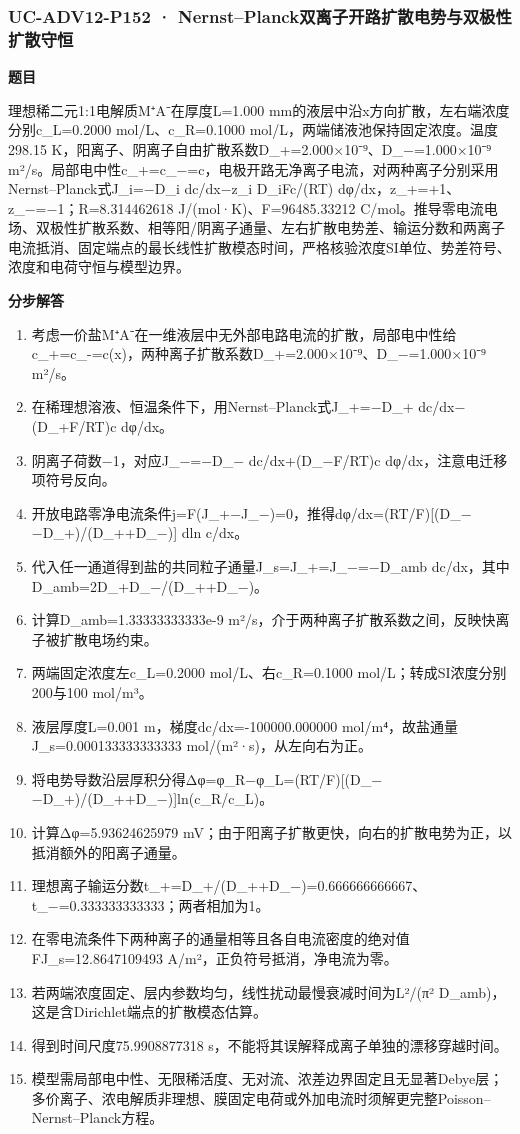 \documentclass[UTF8,11pt,a4paper]{ctexart}
\begin{document}
\subsubsection*{UC-ADV12-P152 · Nernst–Planck双离子开路扩散电势与双极性扩散守恒}
\noindent\textbf{题目}\par
理想稀二元1:1电解质M⁺A⁻在厚度L=1.000 mm的液层中沿x方向扩散，左右端浓度分别c\_L=0.2000 mol/L、c\_R=0.1000 mol/L，两端储液池保持固定浓度。温度298.15 K，阳离子、阴离子自由扩散系数D\_+=2.000×10⁻⁹、D\_−=1.000×10⁻⁹ m²/s。局部电中性c\_+=c\_−=c，电极开路无净离子电流，对两种离子分别采用Nernst–Planck式J\_i=−D\_i dc/dx−z\_i D\_iFc/(RT) dφ/dx，z\_+=+1、z\_−=−1；R=8.314462618 J/(mol·K)、F=96485.33212 C/mol。推导零电流电场、双极性扩散系数、相等阳/阴离子通量、左右扩散电势差、输运分数和两离子电流抵消、固定端点的最长线性扩散模态时间，严格核验浓度SI单位、势差符号、浓度和电荷守恒与模型边界。\par
\medskip\noindent\textbf{分步解答}
\begin{enumerate}
\item 考虑一价盐M⁺A⁻在一维液层中无外部电路电流的扩散，局部电中性给c\_+=c\_-=c(x)，两种离子扩散系数D\_+=2.000×10⁻⁹、D\_−=1.000×10⁻⁹ m²/s。
\item 在稀理想溶液、恒温条件下，用Nernst–Planck式J\_+=−D\_+ dc/dx−(D\_+F/RT)c dφ/dx。
\item 阴离子荷数−1，对应J\_−=−D\_− dc/dx+(D\_−F/RT)c dφ/dx，注意电迁移项符号反向。
\item 开放电路零净电流条件j=F(J\_+−J\_−)=0，推得dφ/dx=(RT/F)[(D\_−−D\_+)/(D\_++D\_−)] dln c/dx。
\item 代入任一通道得到盐的共同粒子通量J\_s=J\_+=J\_−=−D\_amb dc/dx，其中D\_amb=2D\_+D\_−/(D\_++D\_−)。
\item 计算D\_amb=1.33333333333e-9 m²/s，介于两种离子扩散系数之间，反映快离子被扩散电场约束。
\item 两端固定浓度左c\_L=0.2000 mol/L、右c\_R=0.1000 mol/L；转成SI浓度分别200与100 mol/m³。
\item 液层厚度L=0.001 m，梯度dc/dx=-100000.000000 mol/m⁴，故盐通量J\_s=0.000133333333333 mol/(m²·s)，从左向右为正。
\item 将电势导数沿层厚积分得Δφ=φ\_R−φ\_L=(RT/F)[(D\_−−D\_+)/(D\_++D\_−)]ln(c\_R/c\_L)。
\item 计算Δφ=5.93624625979 mV；由于阳离子扩散更快，向右的扩散电势为正，以抵消额外的阳离子通量。
\item 理想离子输运分数t\_+=D\_+/(D\_++D\_−)=0.666666666667、t\_−=0.333333333333；两者相加为1。
\item 在零电流条件下两种离子的通量相等且各自电流密度的绝对值FJ\_s=12.8647109493 A/m²，正负符号抵消，净电流为零。
\item 若两端浓度固定、层内参数均匀，线性扰动最慢衰减时间为L²/(π² D\_amb)，这是含Dirichlet端点的扩散模态估算。
\item 得到时间尺度75.9908877318 s，不能将其误解释成离子单独的漂移穿越时间。
\item 模型需局部电中性、无限稀活度、无对流、浓差边界固定且无显著Debye层；多价离子、浓电解质非理想、膜固定电荷或外加电流时须解更完整Poisson–Nernst–Planck方程。
\end{enumerate}
\end{document}
